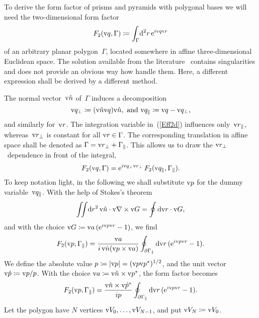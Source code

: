 To derive the form factor of prisms and pyramids with polygonal bases
we will need the two-dimensional form factor
\begin{equation}\label{Eff2d}
  F_2(\text{v}{q},\Gamma)
  \coloneqq \int_{\Gamma}\!\text{d}^2r\, \text{e}^{i\text{v}{q}\text{v}{r}}
\end{equation}
of an arbitrary planar polygon~$\Gamma$,
located somewhere in affine three-dimensional Euclidean space.
The solution available from the literature~\cite{LeMi83}
contains singularities and does not provide an obvious way how handle them.
Here, a different expression shall be derived by a different method.

The normal vector~$\text{v}{\hat n}$ of~$\Gamma$ induces a decomposition
\begin{equation}
  \text{v}{q}_\perp\coloneqq(\text{v}{\hat n}\text{v}{q})\text{v}{\hat n},\text{~and~}\text{v}{q}_\parallel\coloneqq\text{v}{q}-\text{v}{q}_\perp,
\end{equation}
and similarly for~$\text{v}{r}$.
The integration variable in~(\ref{Eff2d}) influences only~$\text{v}{r}_\parallel$,
whereas~$\text{v}{r}_\perp$ is constant for all $\text{v}{r}\in\Gamma$.
The corresponding translation in affine space
shall be denoted as $\Gamma=\text{v}{r}_\perp+\Gamma_\parallel$.
This allows us to draw the $\text{v}{r}_\perp$~dependence in front of the integral,
\begin{equation}\label{EF2F2}
  F_2(\text{v}{q},\Gamma)
  = \text{e}^{i\text{v}{q}_\perp\text{v}{r}_\perp}\,F_2(\text{v}{q}_\parallel,\Gamma_\parallel).
\end{equation}
To keep notation light,
in the following we shall substitute $\text{v}{p}$ for the dummy variable~$\text{v}{q}_\parallel$.
With the help of Stokes's theorem
\begin{equation}\label{EStokes}
  \iint\!\text{d} r^2\,\text{v}{\hat n}\cdot\text{v}{\nabla}\times\text{v}{G} = \oint \text{d}\text{v}{r}\cdot\text{v}{G},
\end{equation}
and with the choice $\text{v}{G}\coloneqq\text{v}{a}\, (\text{e}^{i\text{v}{p}\text{v}{r}}-1)$,
we find
\begin{equation}
  F_2(\text{v}{p},\Gamma_\parallel)=\frac{\text{v}{a}}{i\, \text{v}{\hat n}(\text{v}{p}\times\text{v}{a})} \oint_{\partial\Gamma_\parallel} \text{d}\text{v}{r}\,(\text{e}^{i\text{v}{p}\text{v}{r}}-1).
\end{equation}
We define the absolute value
$p\coloneqq|\text{v}{p}|=(\text{v}{p}\text{v}{p}^*)^{1/2}$,
and the unit vector $\text{v}{\hat p}\coloneqq\text{v}{p}/p$.
With the choice $\text{v}{a}\coloneqq\text{v}{\hat n}\times\text{v}{p}^*$,
the form factor becomes
\begin{equation}\label{Elastoint}
  F_2(\text{v}{p},\Gamma_\parallel)=\frac{\text{v}{\hat n}\times\text{v}{\hat p}^*}{ip} \oint_{\partial\Gamma_\parallel} \text{d}\text{v}{r}\,(\text{e}^{i\text{v}{p}\text{v}{r}}-1).
\end{equation}
Let the polygon have $N$ vertices $\text{v}{V}_0,\ldots,\text{v}{V}_{N-1}$,
and put $\text{v}{V}_N\coloneqq\text{v}{V}_0$.
